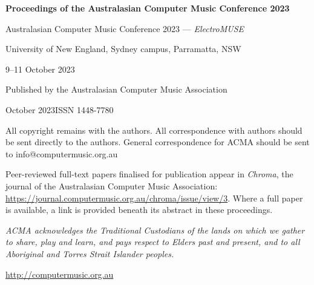 \thispagestyle{empty}
\vspace*{68mm}
{\raggedright
{\large\bfseries Proceedings of the Australasian Computer Music Conference 2023}\par
\vspace{2mm}
Australasian Computer Music Conference 2023 --- \emph{ElectroMUSE}\par
University of New England, Sydney campus, Parramatta, NSW\par
9--11 October 2023\par
\vspace{7mm}
Published by the Australasian Computer Music Association\par
\vspace{1mm}
October 2023\qquad ISSN 1448-7780\par
\vspace{5mm}
All copyright remains with the authors. All correspondence with authors should be sent
directly to the authors. General correspondence for ACMA should be sent to
info@computermusic.org.au\par
\vspace{5mm}
Peer-reviewed full-text papers finalised for publication appear in \emph{Chroma}, the
journal of the Australasian Computer Music Association:
\url{https://journal.computermusic.org.au/chroma/issue/view/3}. Where a full paper is
available, a link is provided beneath its abstract in these proceedings.\par
\vspace{5mm}
\emph{ACMA acknowledges the Traditional Custodians of the lands on which we gather to
share, play and learn, and pays respect to Elders past and present, and to all Aboriginal
and Torres Strait Islander peoples.}\par
\vspace{7mm}
\url{http://computermusic.org.au}\par
}
\clearpage
